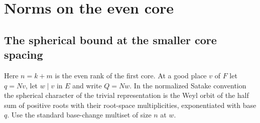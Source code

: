\documentclass[a4paper,11pt]{article}
\theoremstyle{definition}
\theoremstyle{remark}
\numberwithin{equation}{section}
\begin{document}
\section{Norms on the even core}\label{nav:g-VI-4}

\subsection{The spherical bound at the smaller core spacing}\label{nav:II-47}
Here \(n=k+m\) is the even rank of the first core. At a good place
\(v\) of \(F\) let \(q=Nv\), let \(w\mid v\) in \(E\) and write
\(Q=Nw\). In the normalized Satake convention the spherical character
of the trivial representation is the Weyl orbit of the half sum of
positive roots with their root-space multiplicities, exponentiated
with base \(q\). Use the standard base-change multiset of size \(n\)
at \(w\).
\end{document}
